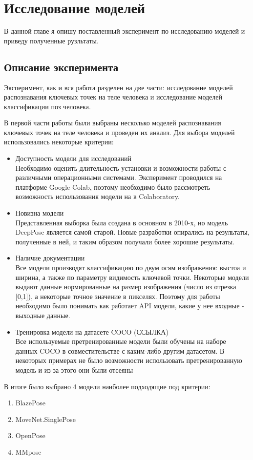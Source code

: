 \section{Исследование моделей}
\label{sec:Chapter4} 

В данной главе я опишу поставленный эксперимент по исследованию моделей и приведу полученные рузльтаты.

\subsection{Описание эксперимента}

Эксперимент, как и вся работа разделен на две части: исследование моделей распознавания ключевых точек на теле человека и исследование моделей классификации поз человека.

В первой части работы были выбраны несколько моделей распознавания ключевых точек на теле человека и проведен их анализ. Для выбора моделей использовались некоторые критерии:

\begin{itemize}
	\item Доступность модели для исследований\\
	Необходимо оценить длительность установки и возможности работы с различными операционными системами. Эксперимент проводился на платформе Google Colab, поэтому необходимо было рассмотреть возможность использования модели на в Colaboratory.
	\item Новизна модели\\
	Представленная выборка была создана в основном в 2010-х, но модель DeepPose является самой старой. Новые разработки опирались на результаты, полученные в ней, и таким образом получали более хорошие результаты.
	\item Наличие документации\\
	Все модели производят классификацию по двум осям изображения: выстоа и ширина, а также по параметру видимость ключевой точки. Некоторые модели выдают данные нормированные на размер изображения (число из отрезка [0,1]), а некоторые точное значение в пикселях. Поэтому для работы необходимо было понимать как работает API модели, какие у нее входные - выходные данные.
	\item Тренировка модели на датасете COCO (ССЫЛКА)\\
	Все используемые претренированные модели были обучены на наборе данных COCO в совместительстве с каким-либо другим датасетом. В некоторых  примерах не было возможности использовать претренированную модель и из-за этого они были отсеяны
\end{itemize}
В итоге было выбрано 4 модели наиболее подходящие под критерии:
\begin{enumerate}
	\item BlazePose
	\item MoveNet.SinglePose
	\item OpenPose
	\item MMpose
\end{enumerate}

